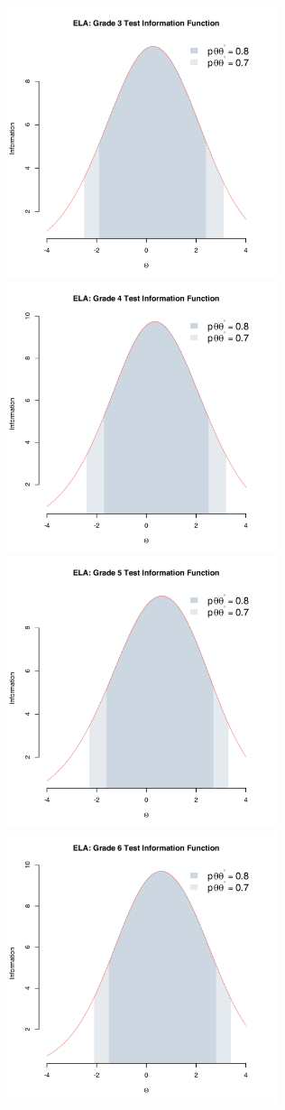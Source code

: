 \documentclass[]{article}
\begin{document}
\includegraphics[width=\textwidth,height=3.125in]{tifs/ela3tif.pdf}
\includegraphics[width=\textwidth,height=3.125in]{tifs/ela4tif.pdf}
\includegraphics[width=\textwidth,height=3.125in]{tifs/ela5tif.pdf}
\includegraphics[width=\textwidth,height=3.125in]{tifs/ela6tif.pdf}
\end{document}
